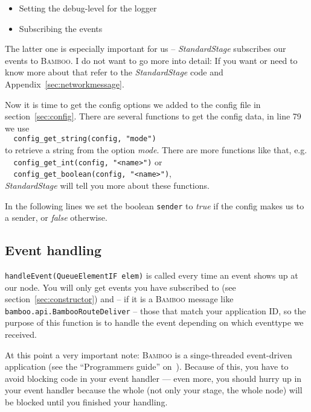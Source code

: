 \documentclass[twocolumn, twoside, a4paper]{article}
\begin{document}
\begin{itemize}
\item Setting the debug-level for the logger
\item Subscribing the events
\end{itemize}

The latter one is especially important for us -- \emph{StandardStage}
subscribes our events to \textsc{Bamboo}. I do not want to go more into detail:
If you want or need to know more about that refer to the
\emph{StandardStage} code and Appendix~\ref{sec:networkmessage}.

Now it is time to get the config options we added to the config file
in section~\ref{sec:config}. There are several functions to get the
config data, in line 79 we use\\
\lstinline$  config_get_string(config, "mode")$ \\
to retrieve a string from the option \emph{mode}. There are more
functions like that, e.g.\\
\lstinline$  config_get_int(config, "<name>")$ or\\
\lstinline$  config_get_boolean(config, "<name>")$,\\
\emph{StandardStage} will tell you more about these functions.

In the following lines we set the boolean \texttt{sender} to
\emph{true} if the config makes us to a sender, or \emph{false}
otherwise. 


\subsection{Event handling}
\label{sec:handleevent}

\texttt{handleEvent(QueueElementIF elem)} is called every time an event
shows up at our node. You will only get events you have subscribed to
(see section~\ref{sec:constructor}) and -- if it is a \textsc{Bamboo} message
like \texttt{bamboo.api.BambooRouteDeliver} -- those that match your
application ID, so the purpose of this function is to handle the
event depending on which eventtype we received.

At this point a very important note: \textsc{Bamboo} is a singe-threaded
event-driven application (see the ``Programmers guide''
on~\cite{bamboo}). Because of this, you have to avoid 
blocking code in your event handler --- even more, you should hurry up
in your event handler because the whole (not only your stage, the
whole node) will be blocked until you finished your handling.
\end{document}
